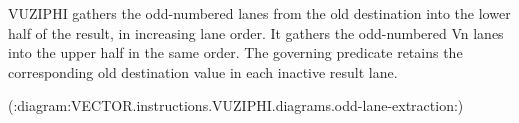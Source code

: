 VUZIPHI gathers the odd-numbered lanes from the old destination into the lower
half of the result, in increasing lane order.  It gathers the odd-numbered Vn
lanes into the upper half in the same order.  The governing predicate retains
the corresponding old destination value in each inactive result lane.

(:diagram:VECTOR.instructions.VUZIPHI.diagrams.odd-lane-extraction:)
